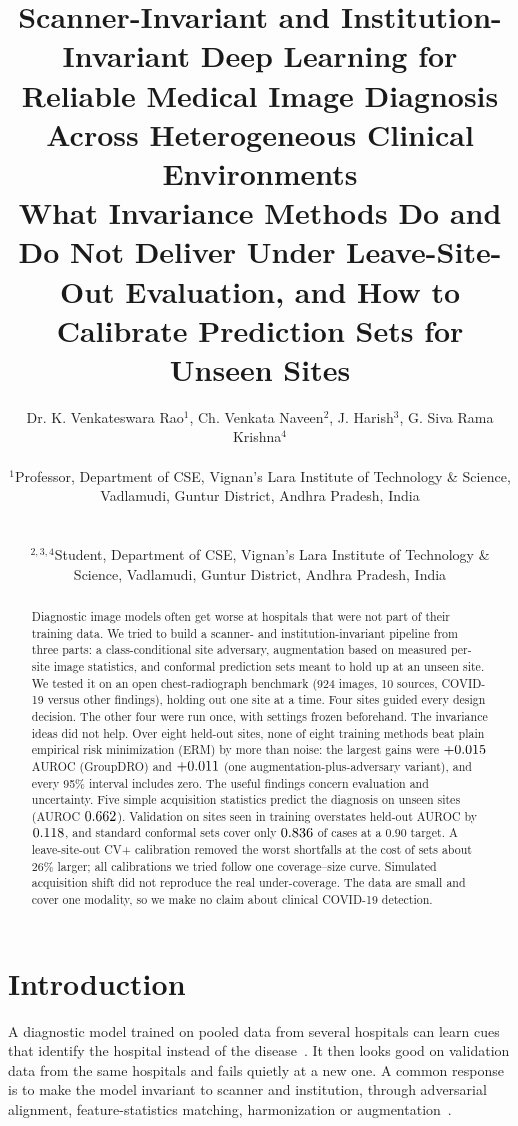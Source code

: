 \documentclass[10pt]{article}
\title{\vspace{-1.2cm}Scanner-Invariant and Institution-Invariant Deep Learning for Reliable Medical Image Diagnosis Across Heterogeneous Clinical Environments\\[3pt]
\large What Invariance Methods Do and Do Not Deliver Under Leave-Site-Out Evaluation, and How to Calibrate Prediction Sets for Unseen Sites}
\author{Dr. K. Venkateswara Rao$^{1}$, Ch. Venkata Naveen$^{2}$, J. Harish$^{3}$, G. Siva Rama Krishna$^{4}$\\[4pt]
\parbox{0.92\textwidth}{\centering\small $^{1}$Professor, Department of CSE, Vignan's Lara Institute of Technology \& Science, Vadlamudi, Guntur District, Andhra Pradesh, India}\\[2pt]
\parbox{0.92\textwidth}{\centering\small $^{2,3,4}$Student, Department of CSE, Vignan's Lara Institute of Technology \& Science, Vadlamudi, Guntur District, Andhra Pradesh, India}}
\date{}
\newcommand{\erm}{ERM}
\begin{document}
\maketitle
\vspace{-0.9cm}
\begin{abstract}
\noindent Diagnostic image models often get worse at hospitals that were not part of their training data. We tried to build a scanner- and institution-invariant pipeline from three parts: a class-conditional site adversary, augmentation based on measured per-site image statistics, and conformal prediction sets meant to hold up at an unseen site. We tested it on an open chest-radiograph benchmark (924 images, 10 sources, COVID-19 versus other findings), holding out one site at a time. Four sites guided every design decision. The other four were run once, with settings frozen beforehand. The invariance ideas did not help. Over eight held-out sites, none of eight training methods beat plain empirical risk minimization (\erm{}) by more than noise: the largest gains were $+0.015$ AUROC (GroupDRO) and $+0.011$ (one augmentation-plus-adversary variant), and every 95\% interval includes zero. The useful findings concern evaluation and uncertainty. Five simple acquisition statistics predict the diagnosis on unseen sites (AUROC $0.662$). Validation on sites seen in training overstates held-out AUROC by $0.118$, and standard conformal sets cover only $0.836$ of cases at a $0.90$ target. A leave-site-out CV+ calibration removed the worst shortfalls at the cost of sets about $26\%$ larger; all calibrations we tried follow one coverage--size curve. Simulated acquisition shift did not reproduce the real under-coverage. The data are small and cover one modality, so we make no claim about clinical COVID-19 detection.
\end{abstract}

\section{Introduction}
A diagnostic model trained on pooled data from several hospitals can learn cues that identify the hospital instead of the disease~\cite{zech2018variable,degrave2021ai,geirhos2020shortcut}. It then looks good on validation data from the same hospitals and fails quietly at a new one. A common response is to make the model invariant to scanner and institution, through adversarial alignment, feature-statistics matching, harmonization or augmentation~\cite{ganin2016domain,sun2016deep,zhang2020generalizing,johnson2007adjusting}.
\end{document}
